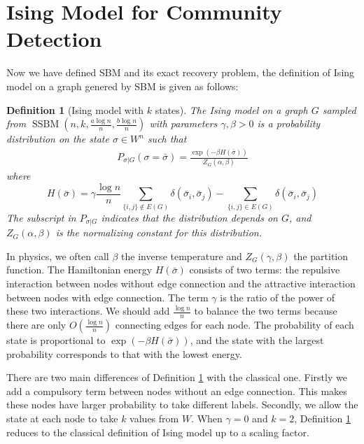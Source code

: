 \documentclass[journal]{IEEEtran}
\newtheorem{definition}{Definition}
\newcommand{\A}{\frac{a \log n}{n}}
\newcommand{\B}{\frac{b \log n}{n}}
\newcommand{\1}{\mathbbm{1}}
\DeclareMathOperator{\SSBM}{SSBM}
\begin{document}
\section{Ising Model for Community Detection}\label{sec:sibm}
Now we have defined SBM and its exact recovery problem, the definition of Ising model on a graph genered by SBM is given
as follows:
\begin{definition}[Ising model with $k$ states]\label{def:ising}
	The Ising model on a graph $G$ sampled from $\SSBM(n,k,\A,\B)$ with parameters $\gamma,\beta>0$
	is a probability distribution on the state $\sigma\in W^n$ such that
	\begin{align} \label{eq:isingma}
	P_{\sigma|G}(\sigma=\bar{\sigma})=\frac{\exp(-\beta H(\bar{\sigma}))}{Z_G(\alpha,\beta)}
	\end{align}
	where
	\begin{equation}\label{eq:energy}
	H(\bar{\sigma}) = \gamma \frac{\log n}{n} \sum_{\{i,j\}\not\in E(G)} \delta(\bar{\sigma}_i, \bar{\sigma}_j)
	- \sum_{\{i,j\}\in E(G)} \delta(\bar{\sigma}_i, \bar{\sigma}_j)
	\end{equation}
	The subscript in $P_{\sigma|G}$ indicates that the distribution depends on $G$, and
	$Z_G(\alpha,\beta)$ is the normalizing constant for this distribution.
\end{definition}
In physics, we often call $\beta$ the inverse temperature and $Z_G(\gamma, \beta)$ the partition function.
The Hamiltonian energy $H(\bar{\sigma})$ consists of two terms: the repulsive interaction between nodes without edge connection
and the attractive interaction between nodes with edge connection. The term $\gamma$ is the ratio of the power of these two
interactions. We should add $\frac{\log n}{n}$ to balance the two terms because there are only $O(\frac{\log n}{n})$
connecting edges for each node.
The probability of each state is proportional to $\exp(-\beta H(\bar{\sigma}))$, and the state with the largest
probability corresponds to that with the lowest energy.

There are two main differences of Definition \ref{def:ising} with the classical one. Firstly we add a compulsory term
between nodes without an edge connection. This makes these nodes have larger probability to take different labels.
Secondly, we allow the state at each node to take $k$ values from $W$.
When $\gamma = 0$ and $k=2$, Definition \ref{def:ising}
reduces to the classical definition of Ising model up to a scaling factor.
\end{document}

